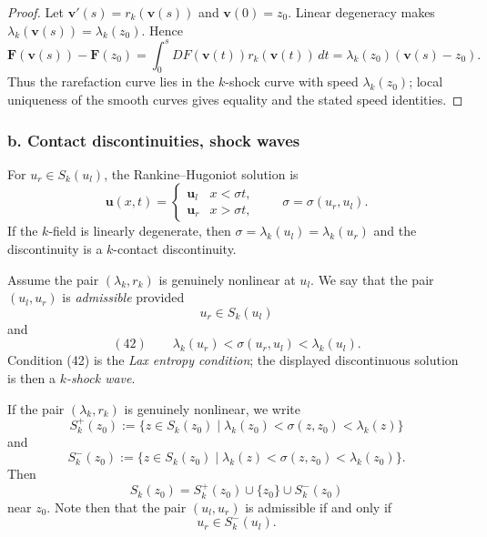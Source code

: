 \begin{proof}
\sketch Let $\mathbf v'(s)=r_k(\mathbf v(s))$ and $\mathbf v(0)=z_0$. Linear degeneracy makes $\lambda_k(\mathbf v(s))=\lambda_k(z_0)$. Hence
\[
\mathbf F(\mathbf v(s))-\mathbf F(z_0)
=\int_0^sDF(\mathbf v(t))r_k(\mathbf v(t))\,dt
=\lambda_k(z_0)(\mathbf v(s)-z_0).
\]
Thus the rarefaction curve lies in the $k$-shock curve with speed $\lambda_k(z_0)$; local uniqueness of the smooth curves gives equality and the stated speed identities.
\end{proof}

\subsubsection*{b. Contact discontinuities, shock waves}

For $u_r\in S_k(u_l)$, the Rankine--Hugoniot solution is
\[
\mathbf u(x,t)=
\begin{cases}
\mathbf u_l & x<\sigma t,\\
\mathbf u_r & x>\sigma t,
\end{cases}
\qquad \sigma=\sigma(u_r,u_l).
\]
If the $k$-field is linearly degenerate, then
$\sigma=\lambda_k(u_l)=\lambda_k(u_r)$ and the discontinuity is a $k$-contact discontinuity.

\begin{definition}
\label{def:admissible-pair-lax-entropy-condition}

Assume the pair $(\lambda_k, r_k)$ is genuinely nonlinear at $u_l$. We say that the pair $(u_l, u_r)$ is \textit{admissible} provided
$$u_r \in S_k(u_l)$$
and
$$(42) \qquad \lambda_k(u_r) < \sigma(u_r,u_l) < \lambda_k(u_l).$$
Condition (42) is the \textit{Lax entropy condition}; the displayed discontinuous solution is then a \textit{$k$-shock wave}.
\end{definition}

\begin{definition}[$S_k^+$ and $S_k^-$]
\label{def:shock-set-plus-minus}

If the pair $(\lambda_k, r_k)$ is genuinely nonlinear, we write
$$S_k^+(z_0) := \{z\in S_k(z_0) \mid \lambda_k(z_0) < \sigma(z,z_0) < \lambda_k(z)\}$$
and
$$S_k^-(z_0) := \{z\in S_k(z_0) \mid \lambda_k(z) < \sigma(z,z_0) < \lambda_k(z_0)\}.$$
Then
$$S_k(z_0) = S_k^+(z_0) \cup \{z_0\} \cup S_k^-(z_0)$$
near $z_0$. Note then that the pair $(u_l, u_r)$ is admissible if and only if
$$u_r \in S_k^-(u_l).$$
\end{definition}

